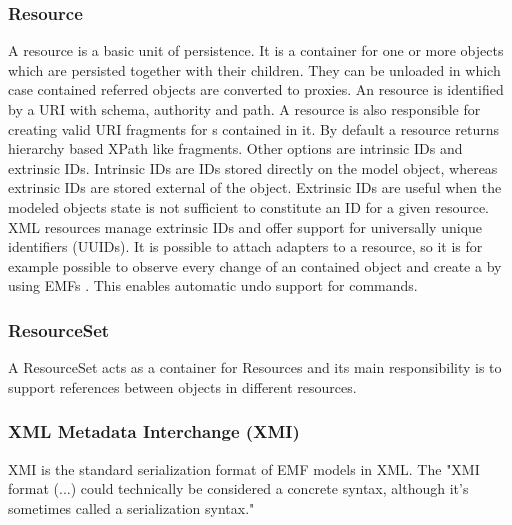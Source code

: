 \subsubsection{Resource}
A resource is a basic unit of persistence. It is a container for one or more objects which are persisted together with their children. They can be unloaded in which case contained referred objects  are converted to proxies. An resource is identified by a URI with schema, authority and path. A resource is also responsible for creating valid URI fragments for s contained in it. By default a resource returns hierarchy based XPath like fragments. Other options are intrinsic IDs and extrinsic IDs. Intrinsic IDs are IDs stored directly on the model object, whereas extrinsic IDs are stored external of the object. Extrinsic IDs are useful when the modeled objects state is not sufficient to constitute an ID for a given resource. XML resources manage extrinsic IDs and offer support for universally unique identifiers (UUIDs). It is possible to attach adapters to a resource, so it is for example possible to observe every change of an contained object and create a  by using EMFs . This enables automatic undo support for commands. \cite{EMF2nd}

\subsubsection{ResourceSet}
A ResourceSet acts as a container for Resources and its main responsibility is to support references between objects in different resources. 

\subsubsection{XML Metadata Interchange (XMI)}
XMI is the standard serialization format of EMF models in XML. The "XMI format (...) could technically be considered a concrete syntax, although it's sometimes called a serialization syntax." \cite{EMP}

